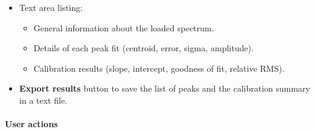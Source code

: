 \begin{itemize}
  \begin{itemize}
  \tightlist
  \item
    Text area listing:

    \begin{itemize}
    \tightlist
    \item
      General information about the loaded spectrum.\\
    \item
      Details of each peak fit (centroid, error, sigma, amplitude).\\
    \item
      Calibration results (slope, intercept, goodness of fit, relative
      RMS).\\
    \end{itemize}
  \item
    \textbf{Export results} button to save the list of peaks and the
    calibration summary in a text file.
  \end{itemize}
\end{itemize}

\hypertarget{user-actions-1}{%
\paragraph{User actions}\label{user-actions-1}}


